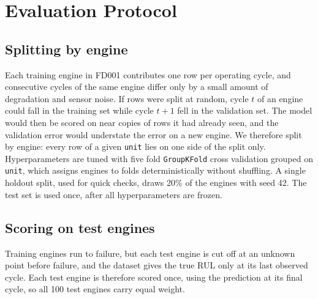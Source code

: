\section{Evaluation Protocol}
\label{sec:evaluation}

\subsection{Splitting by engine}
Each training engine in FD001 contributes one row per operating cycle, and
consecutive cycles of the same engine differ only by a small amount of
degradation and sensor noise. If rows were split at random, cycle $t$ of an
engine could fall in the training set while cycle $t+1$ fell in the
validation set. The model would then be scored on near copies of rows it had
already seen, and the validation error would understate the error on a new
engine. We therefore split by engine: every row of a given \texttt{unit} lies
on one side of the split only. Hyperparameters are tuned with five fold
\texttt{GroupKFold} cross validation grouped on \texttt{unit}, which assigns
engines to folds deterministically without shuffling. A single holdout split,
used for quick checks, draws 20\% of the engines with seed 42. The test set
is used once, after all hyperparameters are frozen.

\subsection{Scoring on test engines}
Training engines run to failure, but each test engine is cut off at an
unknown point before failure, and the dataset gives the true RUL only at its
last observed cycle. Each test engine is therefore scored once, using the
prediction at its final cycle, so all 100 test engines carry equal weight.

